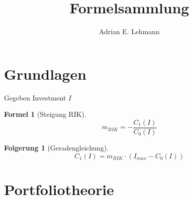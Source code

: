 \documentclass[a4paper]{article}
\title{Formelsammlung}
\author{Adrian E. Lehmann}
\theoremstyle{break}
\newtheorem{formula}{Formel}[section]
\newtheorem{der}{Folgerung}[section]
\begin{document}
    \maketitle
    \tableofcontents
    \newpage
    \section{Grundlagen}
    Gegeben Investment $I$
    \begin{formula}[Steigung RIK]
        $$m_{RIK} = -\frac{C_1(I)}{C_0(I)}$$
    \end{formula}
    \begin{der}[Geradengleichung]
        $$C_1(I) = m_{RIK} \cdot (I_{max} - C_0(I))$$
    \end{der}
    \section{Portfoliotheorie}
\end{document}
